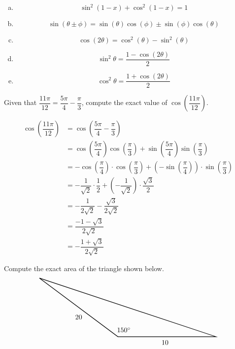 \documentclass[12pt,letterpaper]{exam}
\begin{document}
\begin{questions}
{\itshape \sol 
\begin{enumerate}[(a)]
\item 
	\[
	\sin^2(1 - x) + \cos^2(1 - x)= 1
	\] \pspace

\item 
	\[
	\sin(\theta \pm \phi)= \sin(\theta) \cos(\phi) \pm \sin(\phi) \cos(\theta)
	\] \pspace

\item 
	\[
	\cos(2\theta)= \cos^2(\theta) - \sin^2(\theta)
	\] \pspace

\item 
	\[
	\sin^2 \theta= \dfrac{1 - \cos(2\theta)}{2}
	\] \pspace

\item 
	\[
	\cos^2 \theta= \dfrac{1 + \cos(2\theta)}{2}
	\]
\end{enumerate}
}



\newpage
\question[10] Given that $\dfrac{11\pi}{12}= \dfrac{5\pi}{4} - \dfrac{\pi}{3}$, compute the exact value of $\cos \left( \dfrac{11\pi}{12} \right)$. \pspace

{\itshape \sol
	\[
	\begin{aligned}
	\cos \left( \dfrac{11\pi}{12} \right)&= \cos \left( \dfrac{5\pi}{4} - \dfrac{\pi}{3} \right) \\[0.3cm]
	&= \cos \left( \dfrac{5\pi}{4} \right) \cos \left( \dfrac{\pi}{3} \right) + \sin \left( \dfrac{5\pi}{4} \right) \sin \left( \dfrac{\pi}{3} \right) \\[0.3cm]
	&= -\cos \left( \dfrac{\pi}{4} \right) \cdot \cos \left( \dfrac{\pi}{3} \right) + \left( -\sin \left( \dfrac{\pi}{4} \right) \right) \cdot \sin \left( \dfrac{\pi}{3} \right) \\[0.3cm]
	&= -\dfrac{1}{\sqrt{2}} \cdot \dfrac{1}{2} + \left( -\dfrac{1}{\sqrt{2}} \right) \cdot \dfrac{\sqrt{3}}{2} \\[0.3cm]
	&= -\dfrac{1}{2 \sqrt{2}} - \dfrac{\sqrt{3}}{2 \sqrt{2}} \\[0.3cm]
	&= \dfrac{-1 - \sqrt{3}}{2 \sqrt{2}} \\[0.3cm]
	&= -\dfrac{1 + \sqrt{3}}{2 \sqrt{2}}
	\end{aligned}
	\]
}



\newpage
\question[10] Compute the exact area of the triangle shown below. 
	\[
	\begin{tikzpicture}
	\draw[line width=0.03cm] (-4,3) -- (0,0) -- (5,0) -- (-4,3);
	\node at (0.3,0.35) {$150^\circ$};
	\node at (2.4,-0.3) {$10$};
	\node at (-2,1) {$20$};
	\end{tikzpicture}
	\] \pspace


\end{questions}
\end{document}
